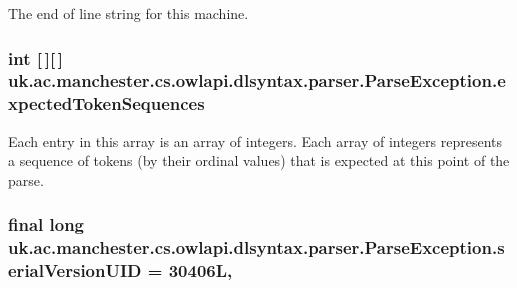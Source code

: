 The end of line string for this machine. \hypertarget{classuk_1_1ac_1_1manchester_1_1cs_1_1owlapi_1_1dlsyntax_1_1parser_1_1_parse_exception_a20be33759c6cb15eb280f0083b192a77}{
\subsubsection[{expected\-Token\-Sequences}]{\setlength{\rightskip}{0pt plus 5cm}int \mbox{[}$\,$\mbox{]}\mbox{[}$\,$\mbox{]} uk.\-ac.\-manchester.\-cs.\-owlapi.\-dlsyntax.\-parser.\-Parse\-Exception.\-expected\-Token\-Sequences}}\label{classuk_1_1ac_1_1manchester_1_1cs_1_1owlapi_1_1dlsyntax_1_1parser_1_1_parse_exception_a20be33759c6cb15eb280f0083b192a77}
Each entry in this array is an array of integers. Each array of integers represents a sequence of tokens (by their ordinal values) that is expected at this point of the parse. \hypertarget{classuk_1_1ac_1_1manchester_1_1cs_1_1owlapi_1_1dlsyntax_1_1parser_1_1_parse_exception_af29891ee959dff0a45865efca182b152}{
\subsubsection[{serial\-Version\-U\-I\-D}]{\setlength{\rightskip}{0pt plus 5cm}final long uk.\-ac.\-manchester.\-cs.\-owlapi.\-dlsyntax.\-parser.\-Parse\-Exception.\-serial\-Version\-U\-I\-D = 30406\-L\hspace{0.3cm}{\ttfamily [static]}, {\ttfamily [private]}}}\label{classuk_1_1ac_1_1manchester_1_1cs_1_1owlapi_1_1dlsyntax_1_1parser_1_1_parse_exception_af29891ee959dff0a45865efca182b152}
